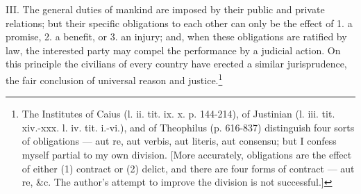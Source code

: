III. The general duties of mankind are imposed by their public and private relations; but their specific obligations to each other can only be the effect of 1. a promise, 2. a benefit, or 3. an injury; and, when these obligations are ratified by law, the interested party may compel the performance by a judicial action. On this principle the civilians of every country have erected a similar jurisprudence, the fair conclusion of universal reason and justice.\footnote{The Institutes of Caius (l. ii. tit. ix. x. p. 144-214), of Justinian (l. iii. tit. xiv.-xxx. l. iv. tit. i.-vi.), and of Theophilus (p. 616-837) distinguish four sorts of obligations \texthebrew{—} aut re, aut verbis, aut literis, aut consensu; but I confess myself partial to my own division. [More accurately, obligations are the effect of either (1) contract or (2) delict, and there are four forms of contract \texthebrew{—} aut re, \&c. The author\texthebrew{}’s attempt to improve the division is not successful.]}

